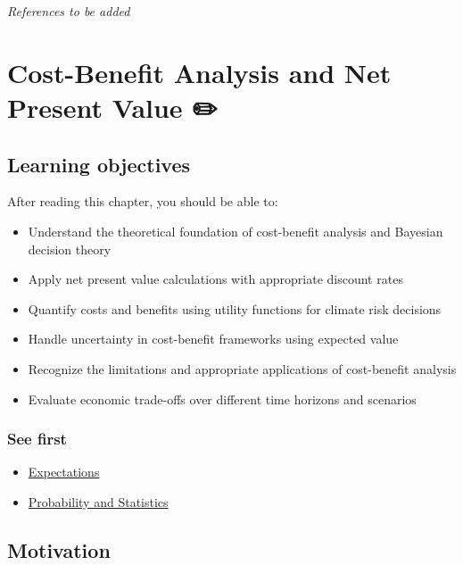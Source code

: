 \documentclass[
  letterpaper,
  DIV=11,
  numbers=noendperiod]{scrreprt}
\providecommand{\tightlist}{%
  \setlength{\itemsep}{0pt}\setlength{\parskip}{0pt}}
\begin{document}
\emph{References to be added}

\chapter{Cost-Benefit Analysis and Net Present Value
✏️}\label{cost-benefit-analysis-and-net-present-value}

\section*{Learning objectives}\label{learning-objectives-14}


After reading this chapter, you should be able to:

\begin{itemize}
\tightlist
\item
  Understand the theoretical foundation of cost-benefit analysis and
  Bayesian decision theory
\item
  Apply net present value calculations with appropriate discount rates
\item
  Quantify costs and benefits using utility functions for climate risk
  decisions
\item
  Handle uncertainty in cost-benefit frameworks using expected value
\item
  Recognize the limitations and appropriate applications of cost-benefit
  analysis
\item
  Evaluate economic trade-offs over different time horizons and
  scenarios
\end{itemize}

\subsection*{See first}\label{see-first-9}

\begin{itemize}
\tightlist
\item
  \hyperref[expectations]{Expectations}
\item
  \hyperref[probability-and-inference]{Probability and Statistics}
\end{itemize}

\section{Motivation}\label{motivation-1}
\end{document}
